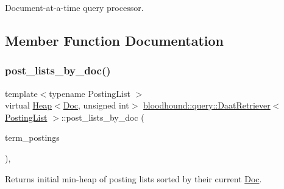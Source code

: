 Document-\/at-\/a-\/time query processor. 

\subsection{Member Function Documentation}
\mbox{\label{classbloodhound_1_1query_1_1DaatRetriever_a6ee7e794376c2633089bd13d48b772cf}} 
\subsubsection{\texorpdfstring{post\+\_\+lists\+\_\+by\+\_\+doc()}{post\_lists\_by\_doc()}}
{\footnotesize\ttfamily template$<$typename Posting\+List $>$ \\
virtual \hyperlink{classbloodhound_1_1Heap}{Heap}$<$\hyperlink{structbloodhound_1_1Doc}{Doc}, unsigned int$>$ \hyperlink{classbloodhound_1_1query_1_1DaatRetriever}{bloodhound\+::query\+::\+Daat\+Retriever}$<$ \hyperlink{classbloodhound_1_1PostingList}{Posting\+List} $>$\+::post\+\_\+lists\+\_\+by\+\_\+doc (\begin{DoxyParamCaption}\item[{const std\+::vector$<$ \hyperlink{classbloodhound_1_1PostingList}{Posting\+List} $>$ \&}]{term\+\_\+postings }\end{DoxyParamCaption})\hspace{0.3cm}{\ttfamily [inline]}, {\ttfamily [virtual]}}



Returns initial min-\/heap of posting lists sorted by their current \hyperlink{structbloodhound_1_1Doc}{Doc}. 

\mbox{\label{classbloodhound_1_1query_1_1DaatRetriever_ab80b4867fc263827dc2fdbe0965a2e8c}} 
